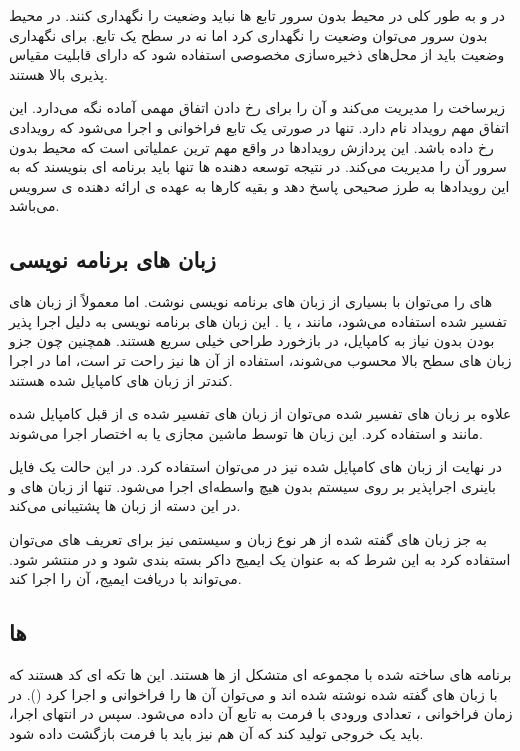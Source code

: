در  و به طور کلی در محیط بدون سرور تابع ها نباید وضعیت را نگهداری کنند. در محیط بدون سرور می‌توان وضعیت را نگهداری کرد اما نه در سطح یک تابع. برای نگهداری وضعیت باید از محل‌های ذخیره‌سازی مخصوصی استفاده شود که دارای قابلیت مقیاس پذیری بالا هستند.

 زیرساخت را مدیریت می‌کند و آن را برای رخ دادن اتفاق مهمی آماده نگه می‌دارد. این اتفاق مهم رویداد نام دارد. تنها در صورتی یک تابع فراخوانی و اجرا می‌شود که رویدادی رخ داده باشد. این پردازش رویدادها در واقع مهم ترین عملیاتی است که محیط بدون سرور آن را مدیریت می‌کند. در نتیجه توسعه دهنده ها تنها باید برنامه ای بنویسند که به این رویدادها به طرز صحیحی پاسخ دهد و بقیه کارها به عهده ی ارائه دهنده ی سرویس می‌باشد.

\subsection{زبان های برنامه نویسی }

 های  را می‌توان با بسیاری از زبان های برنامه نویسی نوشت. اما معمولاً از زبان های تفسیر شده استفاده می‌شود، مانند ،  یا . این زبان های برنامه نویسی به دلیل اجرا پذیر بودن بدون نیاز به کامپایل، در بازخورد طراحی خیلی سریع هستند. همچنین چون جزو زبان های سطح بالا محسوب می‌شوند، استفاده از آن ها نیز راحت تر است، اما در اجرا کندتر از زبان های کامپایل شده هستند.

علاوه بر زبان های تفسیر شده می‌توان از زبان های تفسیر شده ی از قبل کامپایل شده مانند  و  استفاده کرد. این زبان ها توسط ماشین مجازی  یا به اختصار  اجرا می‌شوند.

در نهایت از زبان های کامپایل شده نیز در  می‌توان استفاده کرد. در این حالت یک فایل باینری اجراپذیر بر روی سیستم بدون هیچ واسطه‌ای اجرا می‌شود.  تنها از زبان های  و  در این دسته از زبان ها پشتیبانی می‌کند.

به جز زبان های گفته شده از هر نوع زبان و سیستمی نیز برای تعریف  های  می‌توان استفاده کرد به این شرط که به عنوان یک ایمیج داکر بسته بندی شود و در  منتشر شود.  می‌تواند با دریافت ایمیج، آن را اجرا کند.

\subsection{ ها}

برنامه های ساخته شده با  مجموعه ای متشکل از  ها هستند. این  ها تکه ای کد هستند که با زبان های گفته شده نوشته شده اند و می‌توان آن ها را فراخوانی و اجرا کرد (). در زمان فراخوانی ، تعدادی ورودی با فرمت  به تابع آن داده می‌شود. سپس در انتهای اجرا،  باید یک خروجی تولید کند که آن هم نیز باید با فرمت  بازگشت داده شود.

